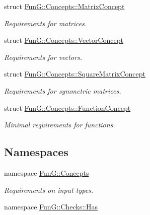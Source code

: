 \begin{DoxyCompactItemize}
struct \hyperlink{structFunG_1_1Concepts_1_1MatrixConcept}{\-Fun\-G\-::\-Concepts\-::\-Matrix\-Concept}
\begin{DoxyCompactList}\small\item\em \-Requirements for matrices. \end{DoxyCompactList}\item 
struct \hyperlink{structFunG_1_1Concepts_1_1VectorConcept}{\-Fun\-G\-::\-Concepts\-::\-Vector\-Concept}
\begin{DoxyCompactList}\small\item\em \-Requirements for vectors. \end{DoxyCompactList}\item 
struct \hyperlink{structFunG_1_1Concepts_1_1SquareMatrixConcept}{\-Fun\-G\-::\-Concepts\-::\-Square\-Matrix\-Concept}
\begin{DoxyCompactList}\small\item\em \-Requirements for symmetric matrices. \end{DoxyCompactList}\item 
struct \hyperlink{structFunG_1_1Concepts_1_1FunctionConcept}{\-Fun\-G\-::\-Concepts\-::\-Function\-Concept}
\begin{DoxyCompactList}\small\item\em \-Minimal requirements for functions. \end{DoxyCompactList}\end{DoxyCompactItemize}
\subsection*{\-Namespaces}
\begin{DoxyCompactItemize}
\item 
namespace \hyperlink{namespaceFunG_1_1Concepts}{\-Fun\-G\-::\-Concepts}
\begin{DoxyCompactList}\small\item\em \-Requirements on input types. \end{DoxyCompactList}\item 
namespace \hyperlink{namespaceFunG_1_1Checks_1_1Has}{\-Fun\-G\-::\-Checks\-::\-Has}
\end{DoxyCompactItemize}
